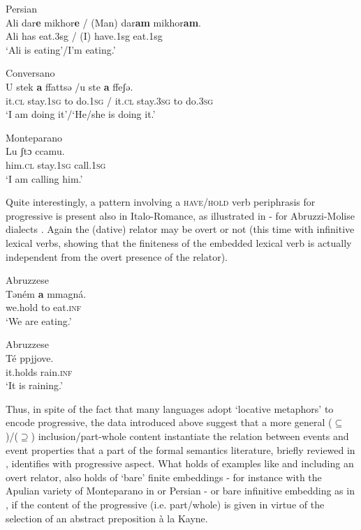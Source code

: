 \documentclass[output=paper,modfonts,nonflat,newtxmath,colorlinks,citecolor=brown]{langsci/langscibook}
\begin{document}
\ea Persian\\%
    \label{ex:franco:15}
    \gll Ali dar\textbf{e} mikhor\textbf{e} / (Man) dar\textbf{am} mikhor\textbf{am}. \\
        Ali has eat.3sg / (I) have.1sg eat.1sg\\
    \glt ‘Ali is eating’/I’m eating.’
    \z


\ea Conversano\\ %
    \label{ex:franco:16}
    \gll U stek   \textbf{a}   ffattsə /u   ste   \textbf{a}  ffeʃə.\\
        it.\textsc{cl}   stay.\textsc{1sg} to   do.\textsc{1sg} / it.\textsc{cl}   stay.\textsc{3sg}   to do.3\textsc{sg}\\
    \glt ‘I am doing it’/‘He/she is doing it.’
    \z
    
\ea Monteparano\\ %
    \label{ex:franco:17}
    \gll Lu   ʃtɔ   ccamu.  \\
        him.\textsc{cl} stay.\textsc{1sg}   call.\textsc{1sg} \\
    \glt ‘I am calling him.’
    \z

   

Quite interestingly, a pattern involving a \textsc{have/hold} verb periphrasis for progressive is present also in Italo-Romance, as illustrated in - for Abruzzi-Molise dialects \citep[555]{Cinque2017}. Again the (dative) relator may be overt  or not  (this time with infinitive lexical verbs, showing that the finiteness of the embedded lexical verb is actually independent from the overt presence of the relator). 

\ea Abruzzese\\%
    \label{ex:franco:18}
    \gll Təném \textbf{a} mmagná.\\
        we.hold to eat.\textsc{inf}\\
    \glt ‘We are eating.’  \citep[133]{Rohlfs1969}

    \z

\ea Abruzzese\\%
    \label{ex:franco:19}
    \gll Té ppjjove.    \\
        it.holds rain.\textsc{inf}\\
    \glt ‘It is raining.’ \citep[266]{Ledgeway2016}
    \z

Thus, in spite of the fact that many languages adopt ‘locative metaphors’ to encode progressive, the data introduced above suggest that a more general (${\subseteq}$)/(${\supseteq}$) inclusion/part-whole content instantiate the relation between events and event properties that a part of the formal semantics literature, briefly reviewed in , identifies with progressive aspect.\textsuperscript{} What holds of examples like  and  including an overt relator, also holds of ‘bare’ finite embeddings - for instance with the Apulian variety of Monteparano in  or Persian  - or bare infinitive embedding as in , if the content of the progressive (i.e. part/whole) is given in virtue of the selection of an abstract preposition {à la} Kayne. 
\end{document}
